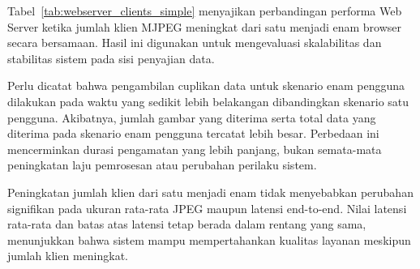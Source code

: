\begin{table}[htbp]
\centering
\caption{Performa Web Server saat Jumlah Pengguna Bertambah}
\label{tab:webserver_clients_simple}
\end{table}


Tabel~\ref{tab:webserver_clients_simple} menyajikan perbandingan performa Web Server ketika jumlah klien MJPEG meningkat dari satu menjadi enam browser secara bersamaan. Hasil ini digunakan untuk mengevaluasi skalabilitas dan stabilitas sistem pada sisi penyajian data.

Perlu dicatat bahwa pengambilan cuplikan data untuk skenario enam pengguna dilakukan pada waktu yang sedikit lebih belakangan dibandingkan skenario satu pengguna. Akibatnya, jumlah gambar yang diterima serta total data yang diterima pada skenario enam pengguna tercatat lebih besar. Perbedaan ini mencerminkan durasi pengamatan yang lebih panjang, bukan semata-mata peningkatan laju pemrosesan atau perubahan perilaku sistem.

Peningkatan jumlah klien dari satu menjadi enam tidak menyebabkan perubahan signifikan pada ukuran rata-rata JPEG maupun latensi end-to-end. Nilai latensi rata-rata dan batas atas latensi tetap berada dalam rentang yang sama, menunjukkan bahwa sistem mampu mempertahankan kualitas layanan meskipun jumlah klien meningkat.

